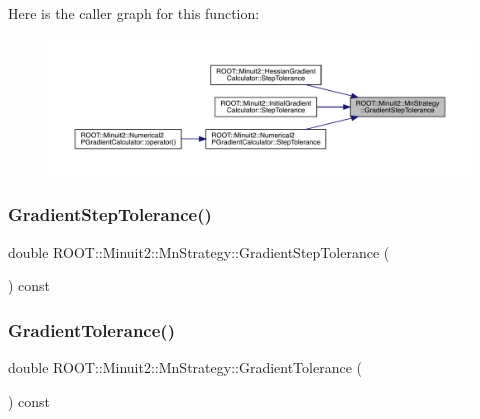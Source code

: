 Here is the caller graph for this function\+:
\nopagebreak
\begin{figure}[H]
\begin{center}
\leavevmode
\includegraphics[width=350pt]{da/de4/classROOT_1_1Minuit2_1_1MnStrategy_a5352522cca1056c242a309d29e28e3c2_icgraph}
\end{center}
\end{figure}
\mbox{\label{classROOT_1_1Minuit2_1_1MnStrategy_a5352522cca1056c242a309d29e28e3c2}} 
\subsubsection{\texorpdfstring{GradientStepTolerance()}{GradientStepTolerance()}\hspace{0.1cm}{\footnotesize\ttfamily [3/3]}}
{\footnotesize\ttfamily double R\+O\+O\+T\+::\+Minuit2\+::\+Mn\+Strategy\+::\+Gradient\+Step\+Tolerance (\begin{DoxyParamCaption}{ }\end{DoxyParamCaption}) const\hspace{0.3cm}{\ttfamily [inline]}}

\mbox{\label{classROOT_1_1Minuit2_1_1MnStrategy_a94681b616c41570e2c81ef5c94cb81dd}} 
\subsubsection{\texorpdfstring{GradientTolerance()}{GradientTolerance()}\hspace{0.1cm}{\footnotesize\ttfamily [1/3]}}
{\footnotesize\ttfamily double R\+O\+O\+T\+::\+Minuit2\+::\+Mn\+Strategy\+::\+Gradient\+Tolerance (\begin{DoxyParamCaption}{ }\end{DoxyParamCaption}) const\hspace{0.3cm}{\ttfamily [inline]}}

